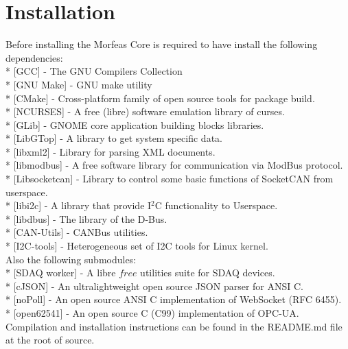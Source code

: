 \section{Installation}
Before installing the Morfeas Core is required to have install the following dependencies:\\
* [GCC] - The GNU Compilers Collection\\
* [GNU Make] - GNU make utility\\
* [CMake] - Cross-platform family of open source tools for package build.\\
* [NCURSES] - A free (libre) software emulation library of curses.\\
* [GLib] - GNOME core application building blocks libraries.\\
* [LibGTop] - A library to get system specific data.\\
* [libxml2] - Library for parsing XML documents.\\
* [libmodbus] - A free software library for communication via ModBus protocol.\\
* [Libsocketcan] - Library to control some basic functions of SocketCAN from userspace.\\
* [libi2c] - A library that provide I$^2$C functionality to Userspace.\\
* [libdbus] - The library of the D-Bus.\\
* [CAN-Utils] - CANBus utilities.\\
* [I2C-tools] - Heterogeneous set of I2C tools for Linux kernel.\\
Also the following submodules:\\
* [SDAQ worker] - A libre \(free\) utilities suite for SDAQ devices.\\
* [cJSON] - An ultralightweight open source JSON parser for ANSI C.\\
* [noPoll] - An open source ANSI C implementation of WebSocket (RFC 6455).\\
* [open62541] - An open source C (C99) implementation of OPC-UA.\\

Compilation and installation instructions can be found in the README.md file at the root of source.
